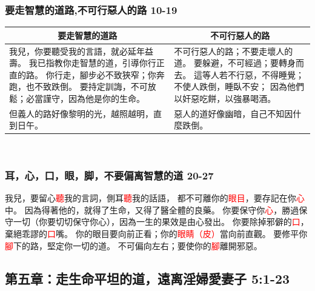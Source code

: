 \subsubsection{要走智慧的道路,不可行惡人的路 10-19}
\begin{table}[H]
\centering
\begin{tabular}{p{8.75cm}|p{8.00cm}}\hline\hline
\multicolumn{1}{c|}{要走智慧的道路}&\multicolumn{1}{c}{不可行惡人的路}\\\hline
我兒，你要聽受我的言語，就必延年益壽。
我已指教你走智慧的道，引導你行正直的路。
你行走，腳步必不致狹窄；你奔跑，也不致跌倒。
要持定訓誨，不可放鬆；必當謹守，因為他是你的生命。
&不可行惡人的路；不要走壞人的道。
要躲避，不可經過；要轉身而去。
這等人若不行惡，不得睡覺；不使人跌倒，睡臥不安；
因為他們以奸惡吃餅，以強暴喝酒。\\\hline
但義人的路好像黎明的光，越照越明，直到日午。
&惡人的道好像幽暗，自己不知因什麼跌倒。
\\\hline
\end{tabular}
\end{table} 


\subsubsection{耳，心，口，眼，脚，不要偏离智慧的道 20-27}
我兒，要留心\textcolor{red}{聽}我的言詞，側耳\textcolor{red}{聽}我的話語，
都不可離你的\textcolor{red}{眼目}，要存記在你\textcolor{red}{心}中。
因為得著他的，就得了生命，又得了醫全體的良藥。
你要保守你\textcolor{red}{心}，勝過保守一切（你要切切保守你心），因為一生的果效是由心發出。
你要除掉邪僻的\textcolor{red}{口}，棄絕乖謬的\textcolor{red}{口}嘴。
你的眼目要向前正看；你的\textcolor{red}{眼睛（皮）}當向前直觀。
要修平你\textcolor{red}{腳}下的路，堅定你一切的道。
不可偏向左右；要使你的\textcolor{red}{腳}離開邪惡。



\subsection{第五章：走生命平坦的道，遠离淫婦愛妻子 5:1-23}
